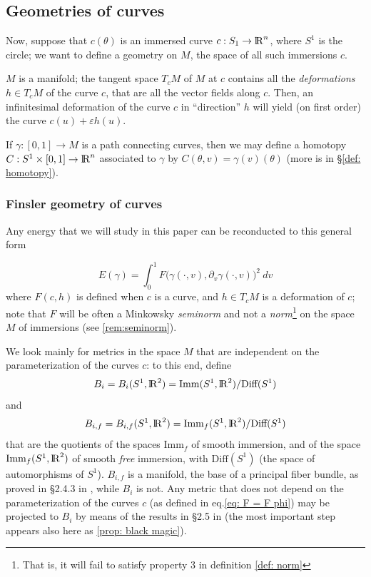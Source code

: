 \documentclass[twoside,a4paper,english]{article}
\def\derpar#1{\partial_{#1}}
\begin{document}
\subsection{Geometries of curves}

Now, suppose that $c(\theta)$ is an immersed curve $c:S_1\to {\protect\mathrm{l\hskip-0.15em R}}^n$,
where $S^1$ is the circle; we want to define 
a geometry on $M$, the space of all such immersions $c$.


$M$ is a manifold; 
the tangent space $T_cM$ of $M$ at $c$ contains all the \emph{deformations}
$h\in T_cM$  of the curve $c$, that are all the vector fields along $c$. Then,
an infinitesimal deformation of the
curve $c$ in ``direction'' $h$ will yield (on first order) the curve 
$c(u)+\varepsilon h(u)$.

If $\gamma :[0,1]\to M$ is a path connecting curves,
then we may define a homotopy $C:S^1\times[0,1]\to{\protect\mathrm{l\hskip-0.15em R}}^n$
associated to $\gamma$ by $C(\theta,v)=\gamma(v)(\theta)$ 
(more is in \S\ref{def: homotopy}).


\subsubsection{Finsler geometry of curves}
\label{sec: Finsler energy}
Any energy that we will study in this paper can be reconducted
to this general form

\begin{equation}
\label{eq: Finsler energy}
E(\gamma)=
\int_0^1 F\Big(\gamma(\cdot,v), \derpar v \gamma(\cdot,v)\Big)^2~dv
\end{equation}
where $F(c,h)$  is defined when $c$ is a curve,
and $h\in T_cM$ is a deformation of $c$; 
note that $F$ will be often a Minkowsky \emph{seminorm} and not a 
\emph{norm}\footnote{That is, it will fail to satisfy property 3
  in definition \ref{def: norm}}
on the space $M$ of immersions (see \ref{rem:seminorm}).


\medskip

We look mainly for metrics in the space $M$ that are independent
on the parameterization of the curves $c$: to this end, \cite{Michor-Mumford}
define 
\[  B_{i} = B_{i} (S^1,{\protect\mathrm{l\hskip-0.15em R}}^2) = \mbox{Imm} (S^1,{\protect\mathrm{l\hskip-0.15em R}}^2)/\mbox{Diff}(S^1) \]
and 
\[  B_{i,f} = B_{i,f} (S^1,{\protect\mathrm{l\hskip-0.15em R}}^2) =\mbox{Imm}_f(S^1,{\protect\mathrm{l\hskip-0.15em R}}^2)/\mbox{Diff}(S^1) \]
that are the quotients
of the spaces $\mbox{Imm}_f$ of smooth immersion, and of the
space $\mbox{Imm}_f (S^1,{\protect\mathrm{l\hskip-0.15em R}}^2)$ of smooth \emph{free} immersion,
with $\mbox{Diff}(S^1)$ (the space of automorphisms of $S^1$).
$B_{i,f}$ is a manifold, the base of a principal fiber bundle, as
proved in \S2.4.3 in \cite{Michor-Mumford}, while $B_{i}$ is not.
Any metric that does not
depend on the parameterization of the curves $c$ (as defined in
eq.\eqref{eq: F = F phi}) may be projected to  $B_{i}$
by means of the results in \S2.5 in \cite{Michor-Mumford}
(the most important step appears also here as \ref{prop: black magic}).
\end{document}
